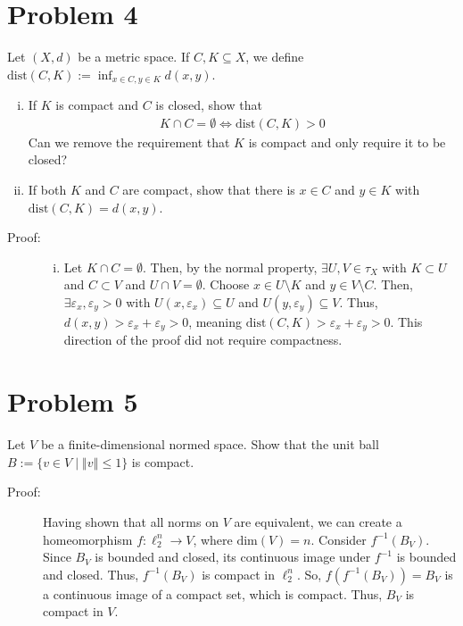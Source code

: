 \documentclass[10pt]{extarticle}
\newcommand{\norm}[1]{\left\Vert #1\right\Vert}
\begin{document}
  \section{Problem 4}%
  Let $(X,d)$ be a metric space. If $C,K\subseteq X$, we define $\text{dist}(C,K):= \inf_{x\in C,y\in K}d(x,y)$.
  \begin{enumerate}[(i)]
    \item If $K$ is compact and $C$ is closed, show that 
      \begin{align*}
        K\cap C = \emptyset \Leftrightarrow \text{dist}(C,K)> 0
      \end{align*}
      Can we remove the requirement that $K$ is compact and only require it to be closed?
    \item If both $K$ and $C$ are compact, show that there is $x\in C$ and $y\in K$ with $\text{dist}(C,K) = d(x,y)$.
  \end{enumerate}
  \begin{description}
    \item[Proof:]\hfill
      \begin{enumerate}[(i)]
        \item Let $K\cap C = \emptyset$. Then, by the normal property, $\exists U,V\in \tau_X$ with $K\subset U$ and $C\subset V$ and $U\cap V = \emptyset$. Choose $x\in U\setminus K$ and $y\in V\setminus C$. Then, $\exists \varepsilon_x,\varepsilon_y>0$ with $U(x,\varepsilon_x)\subseteq U$ and $U(y,\varepsilon_y)\subseteq V$. Thus, $d(x,y) > \varepsilon_x + \varepsilon_y > 0$, meaning $\text{dist}(C,K) > \varepsilon_x + \varepsilon_y > 0$. This direction of the proof did not require compactness.
      \end{enumerate}
  \end{description}
  \section{Problem 5}%
  Let $V$ be a finite-dimensional normed space. Show that the unit ball $B:= \{v\in V\mid \norm{v} \leq 1\}$ is compact.
  \begin{description}
    \item[Proof:] Having shown that all norms on $V$ are equivalent, we can create a homeomorphism $f: \ell_{2}^{n}\rightarrow V$, where $\text{dim}(V) = n$. Consider $f^{-1}(B_V)$. Since $B_V$ is bounded and closed, its continuous image under $f^{-1}$ is bounded and closed. Thus, $f^{-1}(B_V)$ is compact in $\ell_{2}^{n}$. So, $f(f^{-1}(B_V)) = B_V$ is a continuous image of a compact set, which is compact. Thus, $B_V$ is compact in $V$.
  \end{description}
\end{document}

